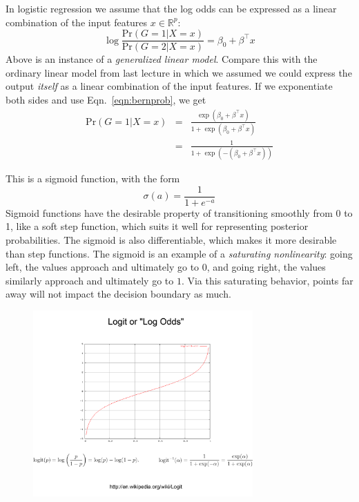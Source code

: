 \documentclass[a4paper]{article}
\begin{document}
In logistic regression we assume that the log odds can be expressed as a linear combination of the input features $x\in {\mathbb R}^p$:
$$
\log \frac{\text{Pr}(G=1|X=x)}{\text{Pr}(G=2|X=x)} = \beta_0 + \beta^\top x
$$
Above is an instance of a \emph{generalized linear model}.  Compare this with the ordinary linear model from last lecture in which we assumed we could express the output \emph{itself} as a linear combination of the input features.  If we exponentiate both sides and use Eqn.\ \ref{eqn:bernprob}, we get
\begin{eqnarray}
\label{eqn:prsig}
\text{Pr}(G=1|X=x)&=&\frac{\exp (\beta_0 + \beta^\top x)}{1+\exp(\beta_0 + \beta^\top x)}\\
&=& \frac{1}{1+\exp\left(-(\beta_0 + \beta^\top x)\right)}
\end{eqnarray}

This is a sigmoid function, with the form
$$\sigma(a)=\frac{1}{1+e^{-a}}$$
Sigmoid functions have the desirable property of transitioning smoothly from 0 to 1, like a soft step function, which suits it well for representing posterior probabilities. The sigmoid is also differentiable, which makes it more desirable than step functions. The sigmoid is an example of a \emph{saturating nonlinearity}: going left, the values approach and ultimately go to $0$, and going right, the values similarly approach and ultimately go to $1$.  Via this saturating behavior,  points far away will not impact the decision boundary as much.

\begin{figure}
\centering
\includegraphics[width=0.75\textwidth]{logit.png}
\end{figure}
\end{document}
